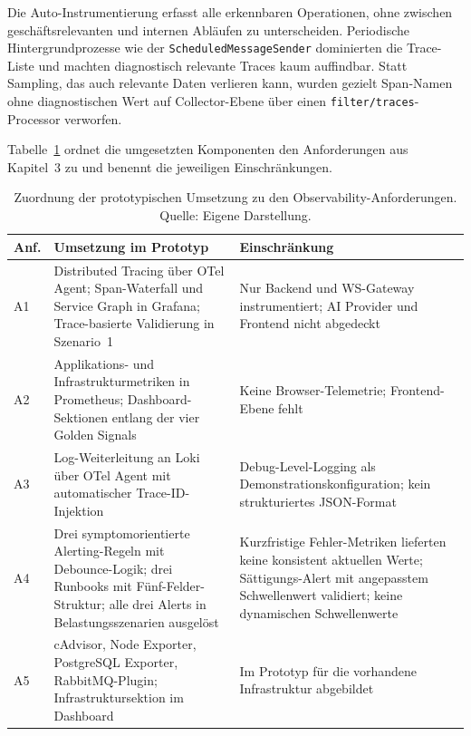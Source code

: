 Die Auto-Instrumentierung erfasst alle erkennbaren Operationen, ohne zwischen geschäftsrelevanten und internen Abläufen zu unterscheiden. Periodische Hintergrundprozesse wie der \texttt{ScheduledMessageSender} dominierten die Trace-Liste und machten diagnostisch relevante Traces kaum auffindbar. Statt Sampling, das auch relevante Daten verlieren kann, wurden gezielt Span-Namen ohne diagnostischen Wert auf Collector-Ebene über einen \texttt{filter/traces}-Processor verworfen.

\bigskip

Tabelle~\ref{tab:anforderungszuordnung} ordnet die umgesetzten Komponenten den Anforderungen aus Kapitel~3 zu und benennt die jeweiligen Einschränkungen.

\begin{table}[ht]
\centering
\caption[Zuordnung der prototypischen Umsetzung zu den Observability-Anforderungen.]{Zuordnung der prototypischen Umsetzung zu den Observability-Anforderungen. \small Quelle: Eigene Darstellung.}
\label{tab:anforderungszuordnung}
\small
\begin{tabularx}{\textwidth}{l >{\RaggedRight\arraybackslash}X >{\RaggedRight\arraybackslash}X}
\toprule
\textbf{Anf.} & \textbf{Umsetzung im Prototyp} & \textbf{Einschränkung} \\
\midrule
A1 & Distributed Tracing über OTel Agent; Span-Waterfall und Service Graph in Grafana; Trace-basierte Validierung in Szenario~1 & Nur Backend und WS-Gateway instrumentiert; AI Provider und Frontend nicht abgedeckt \\[4pt]
A2 & Applikations- und Infrastrukturmetriken in Prometheus; Dashboard-Sektionen entlang der vier Golden Signals & Keine Browser-Telemetrie; Frontend-Ebene fehlt \\[4pt]
A3 & Log-Weiterleitung an Loki über OTel Agent mit automatischer Trace-ID-Injektion & Debug-Level-Logging als Demonstrationskonfiguration; kein strukturiertes JSON-Format \\[4pt]
A4 & Drei symptomorientierte Alerting-Regeln mit Debounce-Logik; drei Runbooks mit Fünf-Felder-Struktur; alle drei Alerts in Belastungsszenarien ausgelöst & Kurzfristige Fehler-Metriken lieferten keine konsistent aktuellen Werte; Sättigungs-Alert mit angepasstem Schwellenwert validiert; keine dynamischen Schwellenwerte \\[4pt]
A5 & cAdvisor, Node Exporter, PostgreSQL Exporter, RabbitMQ-Plugin; Infrastruktursektion im Dashboard & Im Prototyp für die vorhandene Infrastruktur abgebildet \\
\bottomrule
\end{tabularx}
\end{table}